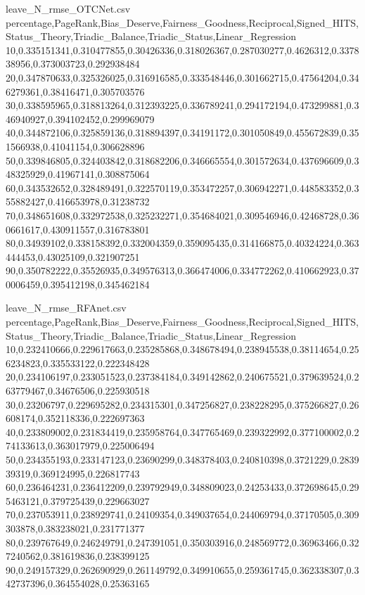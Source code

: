 \begin{filecontents*}{leave_N_rmse_OTCNet.csv}
percentage,PageRank,Bias_Deserve,Fairness_Goodness,Reciprocal,Signed_HITS,Status_Theory,Triadic_Balance,Triadic_Status,Linear_Regression
10,0.335151341,0.310477855,0.30426336,0.318026367,0.287030277,0.4626312,0.337838956,0.373003723,0.292938484
20,0.347870633,0.325326025,0.316916585,0.333548446,0.301662715,0.47564204,0.346279361,0.38416471,0.305703576
30,0.338595965,0.318813264,0.312393225,0.336789241,0.294172194,0.473299881,0.346940927,0.394102452,0.299969079
40,0.344872106,0.325859136,0.318894397,0.34191172,0.301050849,0.455672839,0.351566938,0.41041154,0.306628896
50,0.339846805,0.324403842,0.318682206,0.346665554,0.301572634,0.437696609,0.348325929,0.41967141,0.308875064
60,0.343532652,0.328489491,0.322570119,0.353472257,0.306942271,0.448583352,0.355882427,0.416653978,0.31238732
70,0.348651608,0.332972538,0.325232271,0.354684021,0.309546946,0.42468728,0.360661617,0.430911557,0.316783801
80,0.34939102,0.338158392,0.332004359,0.359095435,0.314166875,0.40324224,0.363444453,0.43025109,0.321907251
90,0.350782222,0.35526935,0.349576313,0.366474006,0.334772262,0.410662923,0.370006459,0.395412198,0.345462184
\end{filecontents*}

\begin{filecontents*}{leave_N_rmse_RFAnet.csv}
percentage,PageRank,Bias_Deserve,Fairness_Goodness,Reciprocal,Signed_HITS,Status_Theory,Triadic_Balance,Triadic_Status,Linear_Regression
10,0.232410666,0.229617663,0.235285868,0.348678494,0.238945538,0.38114654,0.256234823,0.335533122,0.222348428
20,0.234106197,0.233051523,0.237384184,0.349142862,0.240675521,0.379639524,0.263779467,0.34676506,0.225930518
30,0.23206797,0.229695282,0.234315301,0.347256827,0.238228295,0.375266827,0.26608174,0.352118336,0.222697363
40,0.233809002,0.231834419,0.235958764,0.347765469,0.239322992,0.377100002,0.274133613,0.363017979,0.225006494
50,0.234355193,0.233147123,0.23690299,0.348378403,0.240810398,0.3721229,0.283939319,0.369124995,0.226817743
60,0.236464231,0.236412209,0.239792949,0.348809023,0.24253433,0.372698645,0.295463121,0.379725439,0.229663027
70,0.237053911,0.238929741,0.24109354,0.349037654,0.244069794,0.37170505,0.309303878,0.383238021,0.231771377
80,0.239767649,0.246249791,0.247391051,0.350303916,0.248569772,0.36963466,0.327240562,0.381619836,0.238399125
90,0.249157329,0.262690929,0.261149792,0.349910655,0.259361745,0.362338307,0.342737396,0.364554028,0.25363165
\end{filecontents*}

